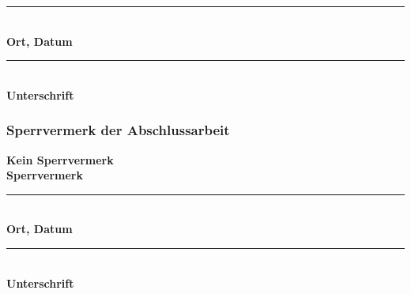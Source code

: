\vspace{1cm}

\noindent
\begin{minipage}[t]{0.45\textwidth}
    \rule{5cm}{0.4pt} \\ 
    \textbf{Ort, Datum}
\end{minipage}%
\hfill
\begin{minipage}[t]{0.45\textwidth}
    \rule{5cm}{0.4pt} \\ 
    \textbf{Unterschrift}
\end{minipage}


\vspace{1cm}
\subsubsection{Sperrvermerk der Abschlussarbeit}

\noindent 
\vspace{5mm}

\noindent
\fbox{\rule{0pt}{1em}\hspace{1em}} \textbf{Kein Sperrvermerk} \\
\noindent
\fbox{\rule{0pt}{1em}\hspace{1em}} \textbf{Sperrvermerk}

\vspace{1cm}

\noindent
\begin{minipage}[t]{0.45\textwidth}
    \rule{5cm}{0.4pt} \\ 
    \textbf{Ort, Datum}
\end{minipage}%
\hfill
\begin{minipage}[t]{0.45\textwidth}
    \rule{5cm}{0.4pt} \\ 
    \textbf{Unterschrift}
\end{minipage}